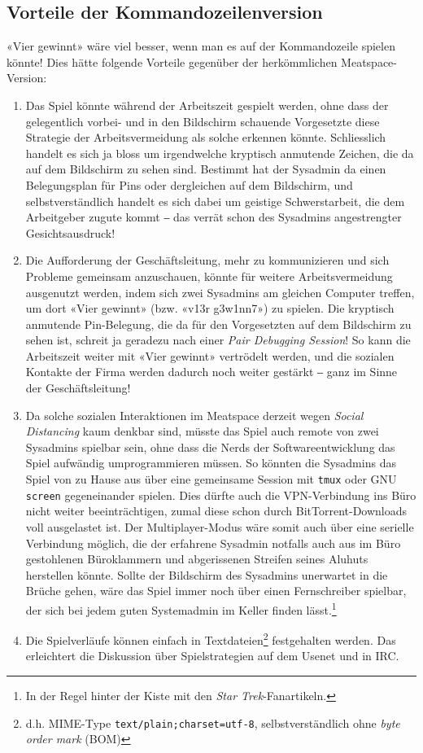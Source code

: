 \documentclass[a4paper,11pt,hidelinks]{scrartcl}
\begin{document}
\subsection{Vorteile der Kommandozeilenversion}

«Vier gewinnt» wäre viel besser, wenn man es auf der Kommandozeile spielen könnte! Dies hätte folgende Vorteile gegenüber der herkömmlichen Meatspace-Version:

\begin{enumerate}
    \item Das Spiel könnte während der Arbeitszeit gespielt werden, ohne dass der gelegentlich vorbei- und in den Bildschirm schauende Vorgesetzte diese Strategie der Arbeitsvermeidung als solche erkennen könnte. Schliesslich handelt es sich ja bloss um irgendwelche kryptisch anmutende Zeichen, die da auf dem Bildschirm zu sehen sind. Bestimmt hat der Sysadmin da einen Belegungsplan für Pins oder dergleichen auf dem Bildschirm, und selbstverständlich handelt es sich dabei um geistige Schwerstarbeit, die dem Arbeitgeber zugute kommt ‒ das verrät schon des Sysadmins angestrengter Gesichtsausdruck!
    \item Die Aufforderung der Geschäftsleitung, mehr zu kommunizieren und sich Probleme gemeinsam anzuschauen, könnte für weitere Arbeitsvermeidung ausgenutzt werden, indem sich zwei Sysadmins am gleichen Computer treffen, um dort «Vier gewinnt» (bzw. «v13r g3w1nn7») zu spielen. Die kryptisch anmutende Pin-Be\-le\-gung, die da für den Vorgesetzten auf dem Bildschirm zu sehen ist, schreit ja geradezu nach einer \textit{Pair Debugging Session}! So kann die Arbeitszeit weiter mit «Vier gewinnt» vertrödelt werden, und die sozialen Kontakte der Firma werden dadurch noch weiter gestärkt ‒ ganz im Sinne der Geschäftsleitung!
    \item Da solche sozialen Interaktionen im Meatspace derzeit wegen \textit{Social Distancing} kaum denkbar sind, müsste das Spiel auch remote von zwei Sysadmins spielbar sein, ohne dass die Nerds der Softwareentwicklung das Spiel aufwändig umprogrammieren müssen. So könnten die Sysadmins das Spiel von zu Hause aus über eine gemeinsame Session mit \texttt{tmux} oder GNU \texttt{screen} gegeneinander spielen. Dies dürfte auch die VPN-Verbindung ins Büro nicht weiter beeinträchtigen, zumal diese schon durch BitTorrent-Downloads voll ausgelastet ist. Der Multiplayer-Modus wäre somit auch über eine serielle Verbindung möglich, die der erfahrene Sysadmin notfalls auch aus im Büro gestohlenen Büroklammern und abgerissenen Streifen seines Aluhuts herstellen könnte. Sollte der Bildschirm des Sysadmins unerwartet in die Brüche gehen, wäre das Spiel immer noch über einen Fernschreiber spielbar, der sich bei jedem guten Systemadmin im Keller finden lässt.\footnote{In der Regel hinter der Kiste mit den \textit{Star Trek}-Fanartikeln.}
    \item Die Spielverläufe können einfach in Textdateien\footnote{d.h. MIME-Type \texttt{text/plain;charset=utf-8}, selbstverständlich ohne \textit{byte order mark} (BOM)} festgehalten werden. Das erleichtert die Diskussion über Spielstrategien auf dem Usenet und in IRC.
\end{enumerate}
\end{document}
